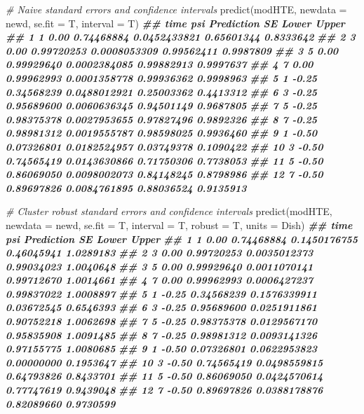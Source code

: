 \documentclass[
]{book}
\newenvironment{Shaded}{\begin{snugshade}}{\end{snugshade}}
\newcommand{\AttributeTok}[1]{\textcolor[rgb]{0.77,0.63,0.00}{#1}}
\newcommand{\CommentTok}[1]{\textcolor[rgb]{0.56,0.35,0.01}{\textit{#1}}}
\newcommand{\DocumentationTok}[1]{\textcolor[rgb]{0.56,0.35,0.01}{\textbf{\textit{#1}}}}
\newcommand{\FunctionTok}[1]{\textcolor[rgb]{0.00,0.00,0.00}{#1}}
\newcommand{\NormalTok}[1]{#1}
\begin{document}
\begin{Shaded}
\begin{Highlighting}[]
\CommentTok{\# Naive standard errors and confidence intervals}
\FunctionTok{predict}\NormalTok{(modHTE, }\AttributeTok{newdata =}\NormalTok{ newd, }\AttributeTok{se.fit =}\NormalTok{ T, }\AttributeTok{interval =}\NormalTok{ T)}
\DocumentationTok{\#\#    time   psi Prediction           SE      Lower     Upper}
\DocumentationTok{\#\# 1     1  0.00 0.74468884 0.0452433821 0.65601344 0.8333642}
\DocumentationTok{\#\# 2     3  0.00 0.99720253 0.0008053309 0.99562411 0.9987809}
\DocumentationTok{\#\# 3     5  0.00 0.99929640 0.0002384085 0.99882913 0.9997637}
\DocumentationTok{\#\# 4     7  0.00 0.99962993 0.0001358778 0.99936362 0.9998963}
\DocumentationTok{\#\# 5     1 {-}0.25 0.34568239 0.0488012921 0.25003362 0.4413312}
\DocumentationTok{\#\# 6     3 {-}0.25 0.95689600 0.0060636345 0.94501149 0.9687805}
\DocumentationTok{\#\# 7     5 {-}0.25 0.98375378 0.0027953655 0.97827496 0.9892326}
\DocumentationTok{\#\# 8     7 {-}0.25 0.98981312 0.0019555787 0.98598025 0.9936460}
\DocumentationTok{\#\# 9     1 {-}0.50 0.07326801 0.0182524957 0.03749378 0.1090422}
\DocumentationTok{\#\# 10    3 {-}0.50 0.74565419 0.0143630866 0.71750306 0.7738053}
\DocumentationTok{\#\# 11    5 {-}0.50 0.86069050 0.0098002073 0.84148245 0.8798986}
\DocumentationTok{\#\# 12    7 {-}0.50 0.89697826 0.0084761895 0.88036524 0.9135913}
\end{Highlighting}
\end{Shaded}

\begin{Shaded}
\begin{Highlighting}[]
\CommentTok{\# Cluster robust standard errors and confidence intervals}
\FunctionTok{predict}\NormalTok{(modHTE, }\AttributeTok{newdata =}\NormalTok{ newd, }\AttributeTok{se.fit =}\NormalTok{ T, }\AttributeTok{interval =}\NormalTok{ T,}
        \AttributeTok{robust =}\NormalTok{ T, }\AttributeTok{units =}\NormalTok{ Dish)}
\DocumentationTok{\#\#    time   psi Prediction           SE      Lower     Upper}
\DocumentationTok{\#\# 1     1  0.00 0.74468884 0.1450176755 0.46045941 1.0289183}
\DocumentationTok{\#\# 2     3  0.00 0.99720253 0.0035012373 0.99034023 1.0040648}
\DocumentationTok{\#\# 3     5  0.00 0.99929640 0.0011070141 0.99712670 1.0014661}
\DocumentationTok{\#\# 4     7  0.00 0.99962993 0.0006427237 0.99837022 1.0008897}
\DocumentationTok{\#\# 5     1 {-}0.25 0.34568239 0.1576339911 0.03672545 0.6546393}
\DocumentationTok{\#\# 6     3 {-}0.25 0.95689600 0.0251911861 0.90752218 1.0062698}
\DocumentationTok{\#\# 7     5 {-}0.25 0.98375378 0.0129567170 0.95835908 1.0091485}
\DocumentationTok{\#\# 8     7 {-}0.25 0.98981312 0.0093141326 0.97155775 1.0080685}
\DocumentationTok{\#\# 9     1 {-}0.50 0.07326801 0.0622953823 0.00000000 0.1953647}
\DocumentationTok{\#\# 10    3 {-}0.50 0.74565419 0.0498559815 0.64793826 0.8433701}
\DocumentationTok{\#\# 11    5 {-}0.50 0.86069050 0.0424570614 0.77747619 0.9439048}
\DocumentationTok{\#\# 12    7 {-}0.50 0.89697826 0.0388178876 0.82089660 0.9730599}
\end{Highlighting}
\end{Shaded}
\end{document}
